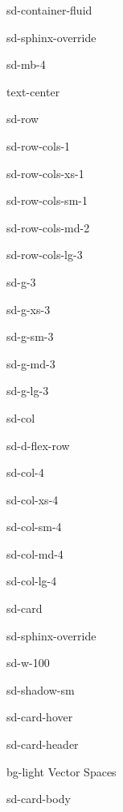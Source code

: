 \documentclass[letterpaper,10pt,english]{jupyterBook}
\let\sphinxpxdimen\pdfpxdimen\else\newdimen\sphinxpxdimen
\begin{document}
\begin{sphinxuseclass}{sd-container-fluid}
\begin{sphinxuseclass}{sd-sphinx-override}
\begin{sphinxuseclass}{sd-mb-4}
\begin{sphinxuseclass}{text-center}
\begin{sphinxuseclass}{sd-row}
\begin{sphinxuseclass}{sd-row-cols-1}
\begin{sphinxuseclass}{sd-row-cols-xs-1}
\begin{sphinxuseclass}{sd-row-cols-sm-1}
\begin{sphinxuseclass}{sd-row-cols-md-2}
\begin{sphinxuseclass}{sd-row-cols-lg-3}
\begin{sphinxuseclass}{sd-g-3}
\begin{sphinxuseclass}{sd-g-xs-3}
\begin{sphinxuseclass}{sd-g-sm-3}
\begin{sphinxuseclass}{sd-g-md-3}
\begin{sphinxuseclass}{sd-g-lg-3}
\begin{sphinxuseclass}{sd-col}
\begin{sphinxuseclass}{sd-d-flex-row}
\begin{sphinxuseclass}{sd-col-4}
\begin{sphinxuseclass}{sd-col-xs-4}
\begin{sphinxuseclass}{sd-col-sm-4}
\begin{sphinxuseclass}{sd-col-md-4}
\begin{sphinxuseclass}{sd-col-lg-4}
\begin{sphinxuseclass}{sd-card}
\begin{sphinxuseclass}{sd-sphinx-override}
\begin{sphinxuseclass}{sd-w-100}
\begin{sphinxuseclass}{sd-shadow-sm}
\begin{sphinxuseclass}{sd-card-hover}
\begin{sphinxuseclass}{sd-card-header}
\begin{sphinxuseclass}{bg-light}
\sphinxAtStartPar
Vector Spaces

\end{sphinxuseclass}
\end{sphinxuseclass}
\begin{sphinxuseclass}{sd-card-body}
\begin{figure}[htbp]
\centering

\noindent\sphinxincludegraphics[width=250\sphinxpxdimen]{{5_subspaces}.png}
\end{figure}


\end{sphinxuseclass}
\end{sphinxuseclass}
\end{sphinxuseclass}
\end{sphinxuseclass}
\end{sphinxuseclass}
\end{sphinxuseclass}
\end{sphinxuseclass}
\end{sphinxuseclass}
\end{sphinxuseclass}
\end{sphinxuseclass}
\end{sphinxuseclass}
\end{sphinxuseclass}
\end{sphinxuseclass}
\end{sphinxuseclass}
\end{sphinxuseclass}
\end{sphinxuseclass}
\end{sphinxuseclass}
\end{sphinxuseclass}
\end{sphinxuseclass}
\end{sphinxuseclass}
\end{sphinxuseclass}
\end{sphinxuseclass}
\end{sphinxuseclass}
\end{sphinxuseclass}
\end{sphinxuseclass}
\end{sphinxuseclass}
\end{sphinxuseclass}
\end{sphinxuseclass}
\end{document}
